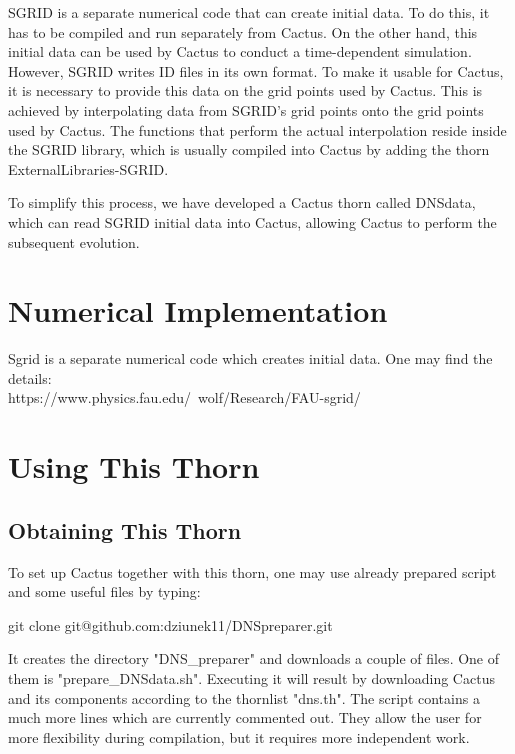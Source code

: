 SGRID is a separate numerical code that can create initial data. To do this, it has to be compiled and run separately from Cactus. On the other hand, this initial data can be used by Cactus to conduct a time-dependent simulation. However, SGRID writes ID files in its own format. To make it usable for Cactus, it is necessary to provide this data on the grid points used by Cactus. This is achieved by interpolating data from SGRID's grid points onto the grid points used by Cactus. The functions that perform the actual interpolation reside inside the SGRID library, which is usually compiled into Cactus by adding the thorn ExternalLibraries-SGRID.

To simplify this process, we have developed a Cactus thorn called DNSdata, which can read SGRID initial data into Cactus, allowing Cactus to perform the subsequent evolution.


\section{Numerical Implementation}

Sgrid is a separate numerical code which creates initial data. One may find the details: \\ https://www.physics.fau.edu/~wolf/Research/FAU-sgrid/

\section{Using This Thorn}

\subsection{Obtaining This Thorn}

To set up Cactus together with this thorn, one may use already prepared script and some useful files by typing:

git clone git@github.com:dziunek11/DNSpreparer.git

It creates the directory "DNS\_preparer" and downloads a couple of files. One of them is "prepare\_DNSdata.sh". Executing it will result by downloading Cactus and its components according to the thornlist "dns.th". The script contains a much more lines which are currently commented out. They allow the user for more flexibility during compilation, but it requires more independent work.

